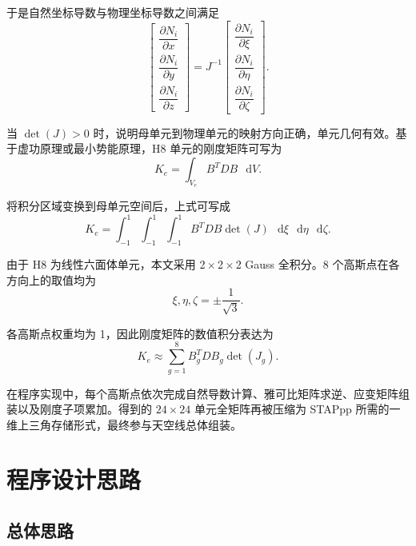 \documentclass[12pt,a4paper]{article}
\newcommand{\dif}{\mathop{}\!\mathrm{d}}
\begin{document}
于是自然坐标导数与物理坐标导数之间满足
\begin{equation}
\begin{bmatrix}
\dfrac{\partial N_i}{\partial x} \\
\dfrac{\partial N_i}{\partial y} \\
\dfrac{\partial N_i}{\partial z}
\end{bmatrix}
=J^{-1}
\begin{bmatrix}
\dfrac{\partial N_i}{\partial \xi} \\
\dfrac{\partial N_i}{\partial \eta} \\
\dfrac{\partial N_i}{\partial \zeta}
\end{bmatrix}.
\end{equation}

当 $\det(J)>0$ 时，说明母单元到物理单元的映射方向正确，单元几何有效。基于虚功原理或最小势能原理，H8 单元的刚度矩阵可写为
\begin{equation}
K_e = \int_{V_e} B^T D B\, \dif V.
\end{equation}

将积分区域变换到母单元空间后，上式可写成
\begin{equation}
K_e = \int_{-1}^{1}\int_{-1}^{1}\int_{-1}^{1} B^T D B\det(J)\, \dif\xi\, \dif\eta\, \dif\zeta.
\end{equation}

由于 H8 为线性六面体单元，本文采用 2\,$\times$\,2\,$\times$\,2 Gauss 全积分。8 个高斯点在各方向上的取值均为
\begin{equation}
\xi,\eta,\zeta = \pm \frac{1}{\sqrt{3}}.
\end{equation}

各高斯点权重均为 1，因此刚度矩阵的数值积分表达为
\begin{equation}
K_e \approx \sum_{g=1}^{8} B_g^T D B_g \det(J_g).
\end{equation}

在程序实现中，每个高斯点依次完成自然导数计算、雅可比矩阵求逆、应变矩阵组装以及刚度子项累加。得到的 $24\times24$ 单元全矩阵再被压缩为 STAPpp 所需的一维上三角存储形式，最终参与天空线总体组装。

\section{程序设计思路}

\subsection{总体思路}
\end{document}

